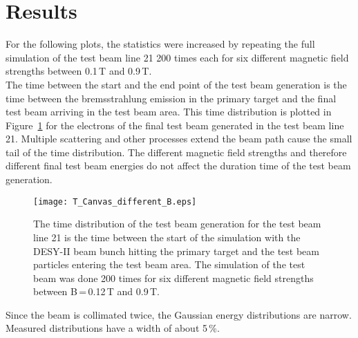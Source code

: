 \section{Results}
For the following plots, the statistics were increased by repeating the full 
simulation of the test beam line 21 200 times each for six different magnetic 
field strengths between 0.1\,T and 0.9\,T.\\
The time between the start and the end point of the test beam generation is the 
time between the bremsstrahlung emission in the primary target and the final 
test beam arriving in the test beam area. This time distribution is plotted in 
Figure~\ref{fig:testbeam_time} for the electrons of the final test beam 
generated in the test beam line 21. Multiple scattering and other processes 
extend the beam path cause the small tail of the time distribution. The 
different magnetic field strengths and therefore different final test beam 
energies do not affect the duration time of the test beam generation.

\begin{figure}[htbp]
  \centering
  \texttt{[image: T\_Canvas\_different\_B.eps]}
  \caption[The time distribution of the test beam generation for test beam line 21.]{The time distribution of the test beam generation for the test beam line 21 is the time between the start of the simulation with the DESY-II beam bunch hitting the primary target and the test beam particles entering the test beam area. The simulation of the test beam was done 200 times for six different magnetic field strengths between B\,=\,0.12\,T and 0.9\,T.}
    \label{fig:testbeam_time}
\end{figure}

Since the beam is collimated twice, the Gaussian energy distributions are narrow. Measured distributions have a width of about 5\,\%. 

